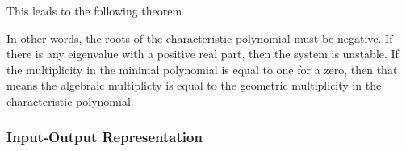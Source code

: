 \documentclass[11pt]{article}
\begin{document}
This leads to the following theorem

In other words, the roots of the characteristic polynomial must be negative.
If there is any eigenvalue with a positive real part, then the system is unstable.
If the multiplicity in the minimal polynomial is equal to one for a zero, then that means the algebraic multiplicty is equal to the geometric multiplicity in the characteristic polynomial.


\subsubsection{Input-Output Representation}
\end{document}
